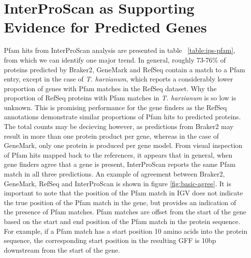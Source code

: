 \section{InterProScan as Supporting Evidence for Predicted Genes}

Pfam hits from InterProScan analysis are presented in table
~\ref{table:ips-pfam}, from which we can identify one major trend. In
general, roughly 73-76\% of proteins predicted by Braker2, GeneMark
and RefSeq contain a match to a Pfam entry, except in the case of
\textit{T. harzianum}, which reports a considerably lower proportion
of genes with Pfam matches in the RefSeq dataset. Why the proportion
of RefSeq proteins with Pfam matches in \textit{T. harzianum} is so
low is unknown. This is promising performance for the gene finders as
the RefSeq annotations demonstrate similar proportions of Pfam hits to
predicted proteins. The total counts may be decieving however, as
predictions from Braker2 may result in more than one protein product
per gene, whereas in the case of GeneMark, only one protein is
produced per gene model. From visual inspection of Pfam hits mapped
back to the references, it appears that in general, when gene finders
agree that a gene is present, InterProScan reports the same Pfam match
in all three predictions. An example of agreement between Braker2,
GeneMark, RefSeq and InterProScan is shown in figure
\ref{fig:basic-agree}. It is important to note that the position of
the Pfam match in IGV does not indicate the true position of the Pfam
match in the gene, but provides an indication of the presence of Pfam
matches. Pfam matches are offset from the start of the gene based on
the start and end position of the Pfam match in the protein
sequence. For example, if a Pfam match has a start position 10 amino
acids into the protein sequence, the corresponding start position in
the resulting GFF is 10bp downstream from the start of the gene.

